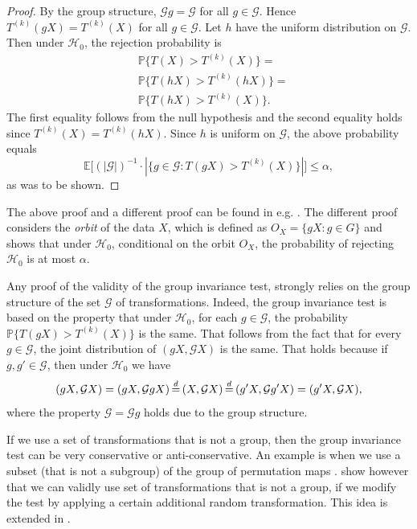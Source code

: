 \documentclass[11pt]{article}
\theoremstyle{plain}
\theoremstyle{definition}
\newcommand{\G}{\mathcal{G}}
\newcommand{\Hy}{\mathcal{H}}
\newcommand{\citt}{\citet}
\newcommand{\citp}{\citep}
\begin{document}
\begin{proof}
By the group structure, $\G g=\G$ for all $g\in \G$. Hence $T^{(k)}(gX)=T^{(k)}(X)$ for all $g\in \G$.
Let $h$ have the uniform distribution on $\G$. Then under $\Hy_0$, the rejection probability is
$$
\begin{aligned}
&\mathbb{P}\big\{T(X)>T^{(k)}(X)\big\}=\\
&\mathbb{P}\big\{T(hX)>T^{(k)}(hX)\big\}=\\
&\mathbb{P}\big\{T(hX)>T^{(k)}(X)\big\}.
\end{aligned}
$$
The first equality follows from the null hypothesis and the second equality holds since $T^{(k)}(X)=T^{(k)}(hX)$. 
Since $h$ is uniform on $\G$, the above probability equals
$$\mathbb{E} \Big [(|\G|)^{-1} \cdot |\big \{g\in \G: T(gX)> T^{(k)}(X) \big \}| \Big ] \leq \alpha,$$ 
as was to be shown.


\end{proof}
The above proof and a different proof can be found in e.g. \citt{hemerik2018exact}. The different proof considers the \emph{orbit} of the data $X$, which is defined as $O_X=\{gX:g\in G\}$ and shows that under $\Hy_0$, conditional on the orbit $O_X$, the probability of rejecting $\Hy_0$ is at most $\alpha$.

Any proof of the validity of the group invariance test, strongly relies on the group structure of the set $\G$ of transformations. Indeed, the group invariance test is based on the property that under $\Hy_0$, for each $g\in \G$, the probability  $\mathbb{P}\big\{T(gX)>T^{(k)}(X)\big\}$ is the same. That follows from the fact that for every $g\in \G$, the joint distribution of $(gX,\G X)$ is the same. That holds because if $g, g'\in \G$, then under $\Hy_0$ we have
$$ (gX,\G X) =  (gX,\G g  X) \,{\buildrel d \over =}\,  (X,\G   X)   \,{\buildrel d \over =}\,  (g'X,\G g'  X) =(g'X,\G X),$$
where the property $\G=\G g$ holds due to the group structure.

If we use a set of transformations that is not a group, then the group invariance test can be very conservative or anti-conservative. An example is when  we use a subset (that is not a subgroup) of the group of permutation maps \citp{southworth2009properties}. \citt[][p.822]{hemerik2018exact} show however that we can validly use set of transformations that is not a group, if we modify the test by applying a certain additional random transformation. This idea is extended in \citt{ramdas2023permutation}.
\end{document}

